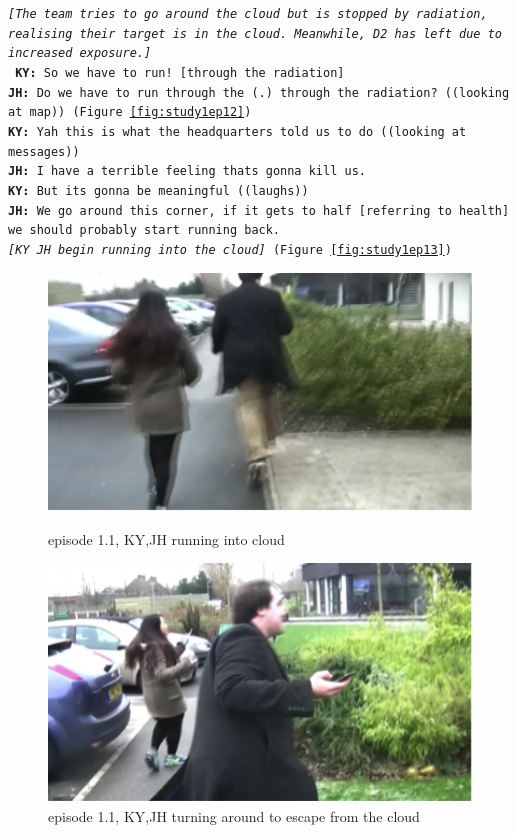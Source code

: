 \noindent\texttt{\emph{[The team tries to go around the cloud but is stopped by radiation, realising their target is in the cloud. Meanwhile, D2 has left due to increased exposure.]\\}
\textbf{KY:} So we have to run! [through the radiation] \\
\textbf{JH:} Do we have to run through the (.) through the radiation? ((looking at map)) (Figure \ref{fig:study1ep12})\\
\textbf{KY:} Yah this is what the headquarters told us to do ((looking at messages)) \\
\textbf{JH:} I have a terrible feeling thats gonna kill us.\\
\textbf{KY:} But its gonna be meaningful ((laughs))\\
\textbf{JH:} We go around this corner, if it gets to half [referring to health] we should probably start running back.\\
\emph{ [KY JH begin running into the cloud] } (Figure \ref{fig:study1ep13})
}

\begin{figure}[ht]
\centering
\begin{minipage}[b]{0.45\linewidth}
\includegraphics[width=1\textwidth]{img/study1/ep1/ep13}
\caption{episode 1.1, KY,JH running into cloud}
\label{fig:study1ep13}
\end{minipage}
\quad
\begin{minipage}[b]{0.45\linewidth}
 \includegraphics[width=1\textwidth]{img/study1/ep1/ep14}
\caption{episode 1.1, KY,JH turning around to escape from the cloud}
\label{fig:study1ep14}
\end{minipage}
\end{figure}

